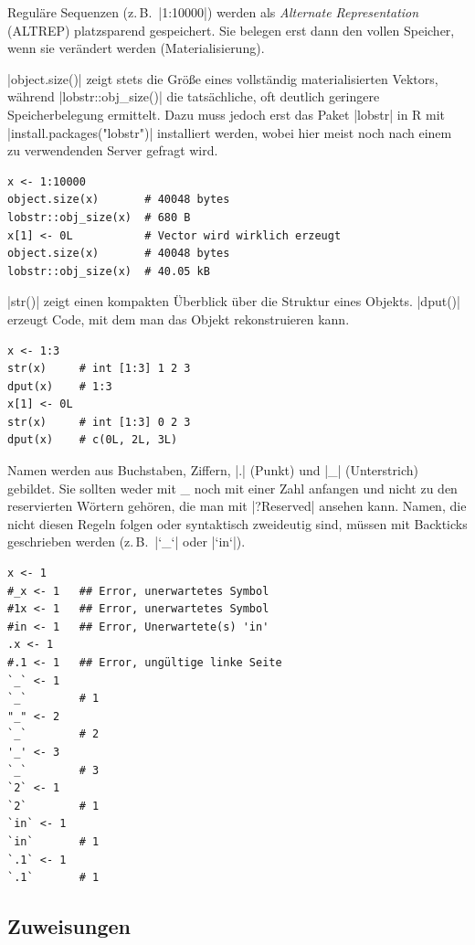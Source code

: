 \documentclass[10pt,twocolumn]{scrartcl}
\renewcommand{\lstinline}{\mycoloredinline}
\begin{document}
Reguläre Sequenzen (z.\,B.\ \lstinline|1:10000|) werden als \emph{Alternate Representation} (ALTREP) platzsparend gespeichert. Sie belegen erst dann den vollen Speicher, wenn sie verändert werden (Materialisierung).

\lstinline|object.size()| zeigt stets die Größe eines vollständig materialisierten Vektors, während \lstinline|lobstr::obj_size()| die tatsächliche, oft deutlich geringere Speicherbelegung ermittelt. Dazu muss jedoch erst das Paket \lstinline|lobstr| in R mit \lstinline|install.packages("lobstr")| installiert werden, wobei hier meist noch nach einem zu verwendenden Server gefragt wird.

\begin{lstlisting}
x <- 1:10000
object.size(x)       # 40048 bytes
lobstr::obj_size(x)  # 680 B
x[1] <- 0L           # Vector wird wirklich erzeugt
object.size(x)       # 40048 bytes
lobstr::obj_size(x)  # 40.05 kB
\end{lstlisting}

\lstinline|str()| zeigt einen kompakten Überblick über die Struktur eines Objekts.
\lstinline|dput()| erzeugt Code, mit dem man das Objekt rekonstruieren kann.

\begin{lstlisting}
x <- 1:3
str(x)     # int [1:3] 1 2 3
dput(x)    # 1:3
x[1] <- 0L
str(x)     # int [1:3] 0 2 3
dput(x)    # c(0L, 2L, 3L)
\end{lstlisting}

Namen werden aus Buchstaben, Ziffern, \lstinline|.| (Punkt) und \lstinline|_| (Unterstrich) gebildet. Sie sollten weder mit \_ noch mit einer Zahl anfangen und nicht zu den reservierten Wörtern gehören, die man mit \lstinline|?Reserved| ansehen kann. Namen, die nicht diesen Regeln folgen oder syntaktisch zweideutig sind, müssen mit Backticks geschrieben werden (z.\,B.\ \lstinline|`_`| oder \lstinline|`in`|).

\begin{lstlisting}
x <- 1
#_x <- 1   ## Error, unerwartetes Symbol
#1x <- 1   ## Error, unerwartetes Symbol
#in <- 1   ## Error, Unerwartete(s) 'in'
.x <- 1
#.1 <- 1   ## Error, ungültige linke Seite
`_` <- 1
`_`        # 1
"_" <- 2
`_`        # 2
'_' <- 3
`_`        # 3
`2` <- 1
`2`        # 1
`in` <- 1
`in`       # 1
`.1` <- 1
`.1`       # 1
\end{lstlisting}


\subsection{Zuweisungen}
\end{document}
